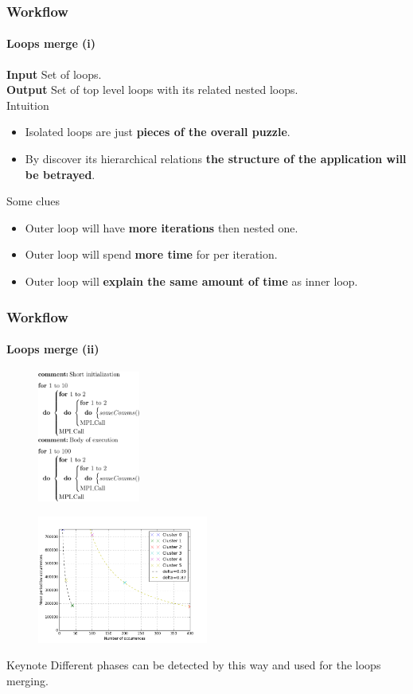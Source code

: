 \documentclass{beamer}
\begin{document}
\begin{frame}
\frametitle{Workflow}
\framesubtitle{Loops merge (i)}
\textbf{Input} Set of loops.\\
\textbf{Output} Set of top level loops with its related nested loops.\\
\vspace{10px}
\pause
Intuition
\begin{itemize}
	\item Isolated loops are just \textbf{pieces of the overall puzzle}.
	\item By discover its hierarchical relations \textbf{the structure of the application will be betrayed}.
\end{itemize}
\pause
Some clues
\begin{itemize}
	\item Outer loop will have \textbf{more iterations} then nested one.
	\item Outer loop will spend \textbf{more time} for per iteration.
	\item Outer loop will \textbf{explain the same amount of time} as inner loop.
\end{itemize}
\end{frame}

\begin{frame}
\frametitle{Workflow}
\framesubtitle{Loops merge (ii)}
\begin{multicols}{2}
	\begin{figure}
		\includegraphics[width=0.3\textwidth]{imgs/delta_clustering_test_1_pse.png}
	\end{figure}
	\pause
	\columnbreak
	\begin{figure}
		\includegraphics[width=0.5\textwidth]{imgs/delta_clustering_test_1.png}
	\end{figure}
\end{multicols}
\pause
\begin{block}{Keynote}
	Different phases can be detected by this way and used for the loops merging.
\end{block}
\end{frame}
\end{document}
